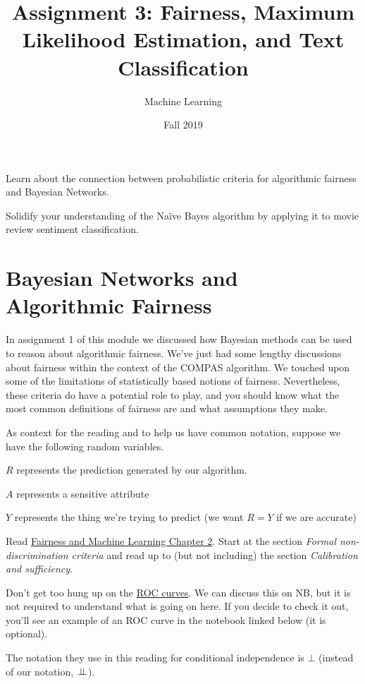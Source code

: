 \documentclass[assignment03_Solutions]{subfiles}
\title{Assignment 3: Fairness, Maximum Likelihood Estimation, and Text Classification}
\author{Machine Learning}
\date{Fall 2019}
\begin{document}
\maketitle
\thispagestyle{firstpage}


\begin{learningobjectives}
\bi
\item Learn about the connection between probabilistic criteria for algorithmic fairness and Bayesian Networks.
\item Solidify your understanding of the Na\"ive Bayes algorithm by applying it to movie review sentiment classification.
\ei
\end{learningobjectives}

\section{Bayesian Networks and Algorithmic Fairness}


In assignment 1 of this module we discussed how Bayesian methods can be used to reason about algorithmic fairness.  We've just had some lengthy discussions about fairness within the context of the COMPAS algorithm.  We touched upon some of the limitations of statistically based notions of fairness.  Nevertheless, these criteria do have a potential role to play, and you should know what the most common definitions of fairness are and what assumptions they make.

As context for the reading and to help us have common notation, suppose we have the following random variables.

\bi
\item $R$ represents the prediction generated by our algorithm.
\item $A$ represents a sensitive attribute
\item $Y$ represents the thing we're trying to predict (we want $R = Y$ if we are accurate)
\ei

\begin{externalresources}[(40 minutes)]
Read \href{https://fairmlbook.org/classification.html}{Fairness and Machine Learning Chapter 2}.  Start at the section \emph{Formal non-discrimination criteria} and read up to (but not including) the section \emph{Calibration and sufficiency}.
\begin{notice}
\bi
\item Don't get too hung up on the \href{https://en.wikipedia.org/wiki/Receiver_operating_characteristic}{ROC curves}.  We can discuss this on NB, but it is not required to understand what is going on here.  If you decide to check it out, you'll see an example of an ROC curve in the notebook linked below (it is optional).
\item The notation they use in this reading for conditional independence is $\bot$ (instead of our notation, $\perp\!\!\!\perp$).
\ei
\end{notice}
\end{externalresources}
\end{document}
